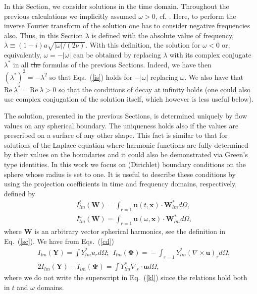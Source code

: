 \documentclass[aps,prx,twocolumn,amsmath,amssymb,amsfonts]{revtex4-2}
\newcommand{\rRe}{\mathrm{Re}}
\begin{document}
In this Section, we consider solutions in the time domain. Throughout the previous calculations we implicitly assumed $\omega>0$, cf. \cite{LL}. Here, to perform the inverse Fourier transform of the solution one has to consider negative frequencies also. Thus, in this Section $\lambda$ is defined with the absolute value of frequency, $\lambda\equiv (1-i) a\sqrt{|\omega|/(2\nu)}$. With this definition, the solution for $\omega<0$ or, equivalently, $\omega=-|\omega|$ can be obtained by replacing $\lambda$ with its complex conjugate $\lambda^*$ in all \sout{the} formulas of the previous Sections. Indeed, we have then $(\lambda^*)^2=-\lambda^2$ so that Eqs.~(\ref{is}) holds for $-|\omega|$ replacing $\omega$. We also have that $\rRe\ \lambda^*=\rRe\ \lambda>0$ so that the conditions of decay at infinity holds (one could also use complex conjugation of the solution itself, which however is less useful below).

The solution, presented in the previous Sections, is determined uniquely by flow values on any spherical boundary. The uniqueness holds also if the values are prescribed on a surface of any other shape. This fact is similar to that for solutions of the Laplace equation where harmonic functions are fully determined by their values on the boundaries and it could also be demonstrated via Green's type identities. In this work we focus on (Dirichlet) boundary conditions on the sphere whose radius is set to one. It is useful to describe these conditions by using the projection coefficients in time and frequency domains, respectively, defined by
\begin{eqnarray}&&
I^{t}_{lm}(\bm W) =\int_{r=1} \bm u(t, \bm x)\cdot \bm W_{lm}^* d\Omega,\nonumber\\&&
I^{\omega}_{lm}(\bm W) =\int_{r=1} \bm u(\omega, \bm x)\cdot \bm W_{lm}^* d\Omega,
\label{def00}
\end{eqnarray}
where $\bm W$ is an arbitrary vector spherical harmonics, see the definition in Eq.~(\ref{sc}). We have from Eqs.~(\ref{cd})
\begin{eqnarray}&&
I_{lm}(\bm Y)\!=\!\int Y_{lm}^* u_r  d\Omega;\ \
I_{lm}(\bm \Phi)\!=\!
-\int_{r=1}  Y_{lm}^* (\nabla\!\times\! \bm u)_r d\Omega
,\nonumber\\&&
2I_{lm}(\bm Y) - I_{lm}(\bm \Psi)\!=\!\int  Y_{lm}^* \nabla_s\cdot\bm u d\Omega,\label{kl}
\end{eqnarray}
where we do not write the superscript in Eq.~(\ref{kl}) since the relations hold both in $t$ and $\omega$ domains.
\end{document}
